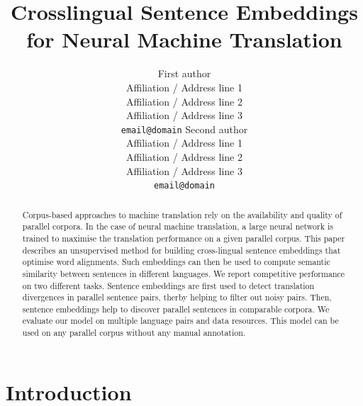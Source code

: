 \documentclass[11pt,a4paper]{article}
\title{Crosslingual Sentence Embeddings for Neural Machine Translation}
\author{%
  First author\\
  Affiliation / Address line 1\\
  Affiliation / Address line 2\\
  Affiliation / Address line 3\\
  {\tt email@domain}  
  \And
  Second author\\
  Affiliation / Address line 1\\
  Affiliation / Address line 2\\
  Affiliation / Address line 3\\
  {\tt email@domain}}
\date{}
\begin{document}
\maketitle
\begin{abstract}


Corpus-based approaches to machine translation rely on the availability and quality of parallel corpora.
In the case of neural machine translation, a large neural network is trained to maximise the translation performance on a given parallel corpus. 
This paper describes an unsupervised method for building cross-lingual
sentence embeddings that optimise word alignments. Such embeddings can then be used to compute semantic similarity between sentences in different languages.
We report competitive performance on two different tasks. 
Sentence embeddings are first used to detect translation divergences
in parallel sentence pairs, therby helping to filter out noisy pairs.
Then, sentence embeddings help to discover parallel sentences in comparable corpora.
We evaluate our model on multiple language pairs and data resources.
This model can be used on any parallel corpus without any manual annotation.


\end{abstract}

\section{Introduction}
\end{document}
